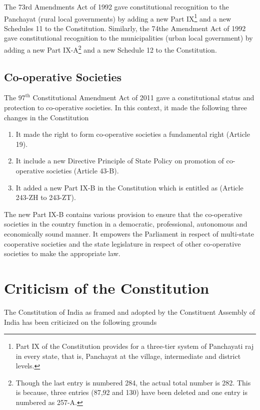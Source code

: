 The 73rd Amendments Act of 1992 gave constitutional recognition to the Panchayat (rural local governments) by adding a new Part IX\footnote{Part IX of the Constitution provides for a three-tier system of Panchayati raj in every state, that is, Panchayat at the village, intermediate and district levels.} and a new Schedules 11 to the Constitution. Similarly, the 74the Amendment Act of 1992 gave constitutional recognition to the municipalities (urban local government) by adding a new Part IX-A\footnote{Though the last entry is numbered 284, the actual total number is 282. This is because, three entries (87,92 and 130) have been deleted and one entry is numbered as 257-A.} and a new Schedule 12 to the Constitution.

\subsection{Co-operative Societies}

The $97^{\text{th}}$ Constitutional Amendment Act of 2011 gave a constitutional status and protection to co-operative societies. In this context, it made the following three changes in the Constitution

\begin{enumerate}
  \item It made the right to form co-operative societies a fundamental right (Article 19).
  \item It include a new Directive Principle of State Policy on promotion of co-operative societies (Article 43-B).
  \item It added a new Part IX-B in the Constitution which is entitled as  (Article 243-ZH to 243-ZT).
\end{enumerate}

The new Part IX-B contains various provision to ensure that the co-operative societies in the country function in a democratic, professional, autonomous and economically sound manner. It empowers the Parliament in respect of multi-state cooperative societies and the state legislature in respect of other co-operative societies to make the appropriate law.

\section{Criticism of the Constitution}

The Constitution of India as framed and adopted by the Constituent Assembly of India has been criticized on the following grounds

